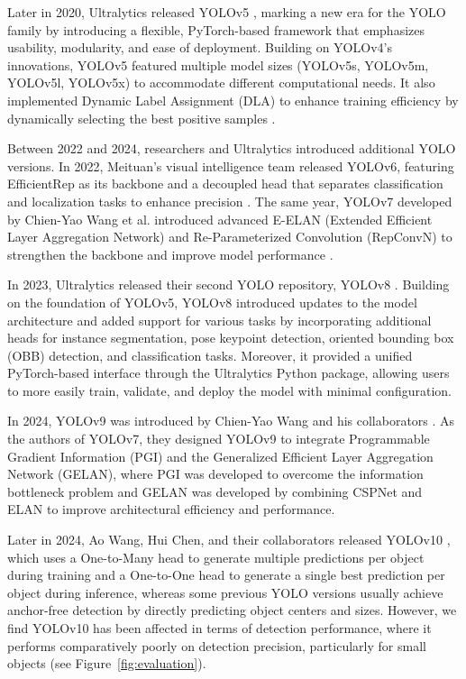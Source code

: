 \documentclass[runningheads]{llncs}
\begin{document}
Later in 2020, Ultralytics released YOLOv5 \cite{Jocher2020a}, marking a new era for the YOLO family by introducing a flexible, PyTorch-based framework that emphasizes usability, modularity, and ease of deployment. Building on YOLOv4’s innovations, YOLOv5 featured multiple model sizes (YOLOv5s, YOLOv5m, YOLOv5l, YOLOv5x) to accommodate different computational needs. It also implemented Dynamic Label Assignment (DLA) to enhance training efficiency by dynamically selecting the best positive samples \cite{Ge2021}.

Between 2022 and 2024, researchers and Ultralytics introduced additional YOLO versions. In 2022, Meituan’s visual intelligence team released YOLOv6, featuring EfficientRep as its backbone and a decoupled head that separates classification and localization tasks to enhance precision \cite{Li2022}. The same year, YOLOv7 developed by Chien-Yao Wang et al. introduced advanced E-ELAN (Extended Efficient Layer Aggregation Network) and Re-Parameterized Convolution (RepConvN) to strengthen the backbone and improve model performance \cite{Wang2023}.

In 2023, Ultralytics released their second YOLO repository, YOLOv8 \cite{Jocher2023}. Building on the foundation of YOLOv5, YOLOv8 introduced updates to the model architecture and added support for various tasks by incorporating additional heads for instance segmentation, pose keypoint detection, oriented bounding box (OBB) detection, and classification tasks. Moreover, it provided a unified PyTorch-based interface through the Ultralytics Python package, allowing users to more easily train, validate, and deploy the model with minimal configuration.

In 2024, YOLOv9 was introduced by Chien-Yao Wang and his collaborators \cite{Wang2025}. As the authors of YOLOv7, they designed YOLOv9 to integrate Programmable Gradient Information (PGI) and the Generalized Efficient Layer Aggregation Network (GELAN), where PGI was developed to overcome the information bottleneck problem and GELAN was developed by combining CSPNet and ELAN to improve architectural efficiency and performance.

Later in 2024, Ao Wang, Hui Chen, and their collaborators released YOLOv10 \cite{Wang2024a}, which uses a One-to-Many head to generate multiple predictions per object during training and a One-to-One head to generate a single best prediction per object during inference, whereas some previous YOLO versions usually achieve anchor-free detection by directly predicting object centers and sizes. However, we find YOLOv10 has been affected in terms of detection performance, where it performs comparatively poorly on detection precision, particularly for small objects (see Figure~\ref{fig:evaluation}).
\end{document}
